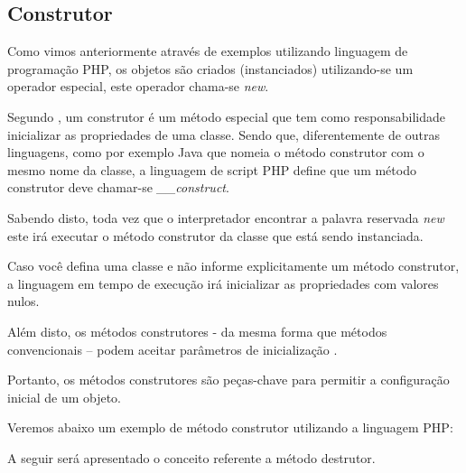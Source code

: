 \subsection{Construtor}

Como vimos anteriormente através de exemplos utilizando linguagem de
programação PHP, os objetos são criados (instanciados) utilizando-se um
operador especial, este operador chama-se \textit{new}.

Segundo , um construtor é um método especial que tem
como responsabilidade inicializar as propriedades de uma classe. Sendo que,
diferentemente de outras linguagens, como por exemplo Java que nomeia o  método
construtor com o mesmo nome da classe, a linguagem de script PHP define  que um
método construtor deve chamar-se \textit{\_\_construct}.

Sabendo disto, toda vez que o interpretador encontrar a palavra reservada
\textit{new} este irá executar o método construtor da classe que está sendo
instanciada.

Caso você defina uma classe e não informe explicitamente um método construtor, a
linguagem em tempo de execução irá inicializar as propriedades com valores nulos.

Além disto, os métodos construtores - da mesma forma que métodos convencionais –
podem aceitar parâmetros de inicialização \cite{learningJava}.

Portanto, os métodos construtores são peças-chave para permitir a configuração
inicial de um objeto.

Veremos abaixo um exemplo de método construtor utilizando a linguagem PHP:

A seguir será apresentado o conceito referente a método destrutor.